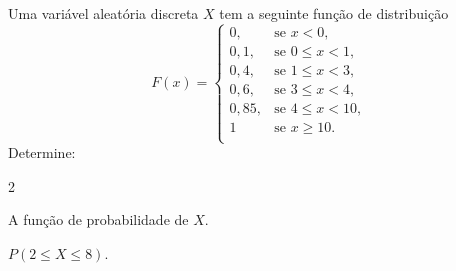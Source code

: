 %
%


\begin{exercicioBanco}[\valorquestao]
Uma variável aleatória discreta \(X\) tem a seguinte função de distribuição
%
\[
    F(x) = \left\{
    \begin{array}{rl}
        0, & \text{se } x < 0, \\
        0,1, & \text{se } 0 \le x < 1, \\
        0,4, & \text{se } 1 \le x < 3, \\
        0,6, & \text{se } 3 \le x < 4, \\
        0,85, & \text{se } 4 \le x < 10, \\
        1 & \text{se } x \ge 10. \\
    \end{array}
    \right.
\]
%
Determine:
\begin{enumerate}[(a)]
    \begin{multicols}{2}
        \item A função de probabilidade de \(X\).
        \item \(P(2 \le X \le 8)\).
    \end{multicols}
\end{enumerate}
%
\end{exercicioBanco}

